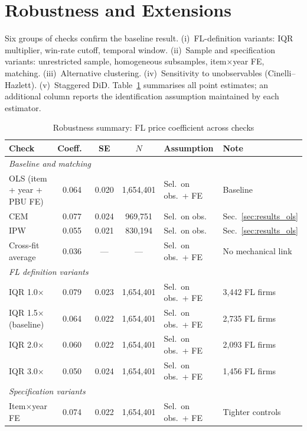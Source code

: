 
\section{Robustness and Extensions}
\label{sec:robustness}


Six groups of checks confirm the baseline result. (i)~FL-definition
variants: IQR multiplier, win-rate cutoff, temporal window.
(ii)~Sample and specification variants: unrestricted sample,
homogeneous subsamples, item$\times$year FE, matching.
(iii)~Alternative clustering. (iv)~Sensitivity to unobservables
(Cinelli--Hazlett). (v)~Staggered DiD.
Table~\ref{tab:robustness_summary} summarises all point estimates;
an additional column reports the identification assumption maintained
by each estimator.


\begin{table}[htbp]
\centering
\caption{Robustness summary: FL price coefficient across checks}
\label{tab:robustness_summary}
\small
\begin{tabular}{lcccll}
\hline\hline
Check & Coeff.\ & SE & $N$ & Assumption & Note \\
\hline
\multicolumn{6}{l}{\textit{Baseline and matching}} \\
OLS (item + year + PBU FE) & 0.064 & 0.020 & 1{,}654{,}401 & Sel.\ on obs.\ + FE & Baseline \\
CEM & 0.077 & 0.024 & 969{,}751 & Sel.\ on obs. & Sec.~\ref{sec:results_ols} \\
IPW & 0.055 & 0.021 & 830{,}194 & Sel.\ on obs. & Sec.~\ref{sec:results_ols} \\
Cross-fit average & 0.036 & --- & --- & Sel.\ on obs.\ + FE & No mechanical link \\
\hline
\multicolumn{6}{l}{\textit{FL definition variants}} \\
IQR 1.0$\times$ & 0.079 & 0.023 & 1{,}654{,}401 & Sel.\ on obs.\ + FE & 3{,}442 FL firms \\
IQR 1.5$\times$ (baseline) & 0.064 & 0.022 & 1{,}654{,}401 & Sel.\ on obs.\ + FE & 2{,}735 FL firms \\
IQR 2.0$\times$ & 0.060 & 0.022 & 1{,}654{,}401 & Sel.\ on obs.\ + FE & 2{,}093 FL firms \\
IQR 3.0$\times$ & 0.050 & 0.024 & 1{,}654{,}401 & Sel.\ on obs.\ + FE & 1{,}456 FL firms \\
\hline
\multicolumn{6}{l}{\textit{Specification variants}} \\
Item$\times$year FE & 0.074 & 0.022 & 1{,}654{,}401 & Sel.\ on obs.\ + FE & Tighter controls \\

\end{tabular}
\end{table}
